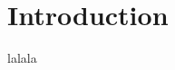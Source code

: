 \documentclass{llncs}
\begin{document}
\section{Introduction}
lalala ~\cite{garcinpen2013}

%


\end{document}
